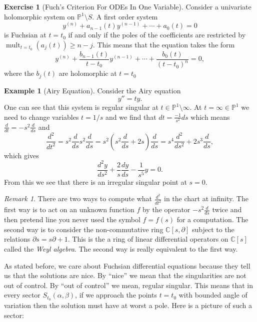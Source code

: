 \documentclass[12pt]{book}
\numberwithin{equation}{section}
\theoremstyle{definition}
\newtheorem{example}[theorem]{Example}
\newtheorem{exercise}[theorem]{Exercise}
\theoremstyle{remark}
\newtheorem{remark}[theorem]{Remark}
\newcommand{\CC}{\mathbb{C}}
\newcommand{\PP}{\mathbb{P}}
\newcommand{\mult}{\operatorname{mult}}
\begin{document}
\begin{exercise}[Fuch's Criterion For ODEs In One Variable]
	Consider a univariate holomorphic system on $\PP^1\setminus S$. 
	A first order system 
	 $$ y^{(n)} + a_{n-1}(t) y^{(n-1)} + \cdots + a_0(t)=0 $$
	is Fuchsian at $t=t_0$ if and only if  the poles of the coefficients are restricted by $\mult_{t=t_0}( a_j(t) ) \geq n-j $.
	This means that the equation takes the form
	 	 $$ y^{(n)} + \frac{b_{n-1}(t)}{t-t_0} y^{(n-1)} + \cdots + \frac{b_{0}(t)}{(t-t_0)^n} =0, $$
	where the $b_j(t)$ are holomorphic at $t=t_0$
\end{exercise}

\begin{example}[Airy Equation]
	Consider the Airy equation 
	 $$ y'' = ty.$$
	One can see that this system is regular singular at $t \in \PP^1\setminus \infty$.  
	At $t=\infty \in \PP^1$ we need to change variables $t=1/s$ and we find that $dt = \frac{-1}{s^2}ds$ which means $\frac{d}{dt} = -s^2 \frac{d}{ds}$ and $$\frac{d^2}{dt^2} = s^2 \frac{d}{ds} s^2 \frac{d}{ds}= s^2 (s^2\frac{d}{ds} + 2s)\frac{d}{ds} = s^4\frac{d^2}{ds^2}+2s^3 \frac{d}{ds},$$
	which gives 
	 $$ \frac{d^2y}{ds^2}+ \frac{2}{s} \frac{dy}{ds} - \frac{1}{s^5} y=0. $$
	From this we see that there is an irregular singular point at $s=0$.
\end{example}

\begin{remark}
	There are two ways to compute what $\frac{d^2}{dt^2}$ in the chart at infinity. 
	The first way is to act on an unknown function $f$ by the operator $-s^2 \frac{d}{ds}$ twice and then pretend line you never used the symbol $f=f(s)$ for a computation.
	The second way is to consider the non-commutative ring $\CC[s,\partial]$ subject to the relations $\partial s = s\partial + 1$. 
	This is the a ring of linear differential operators on $\CC[s]$ called the \emph{Weyl algebra}.
	The second way is really equivalent to the first way.
\end{remark}

As stated before, we care about Fuchsian differential equations because they tell us that the solutions are nice. 
By ``nice'' we mean that the singularities are not out of control.
By ``out of control'' we mean, regular singular. 
This means that in every sector $S_{t_0}(\alpha,\beta)$, if we approach the points $t=t_0$ with bounded angle of variation then the solution must have at worst a pole.
Here is a picture of such a sector:
\end{document}
